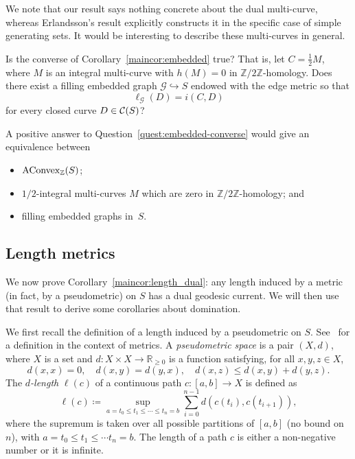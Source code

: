 We note that our result says nothing concrete about the dual multi-curve, whereas Erlandsson's result explicitly constructs it in the specific case of simple generating sets. It would be interesting to describe these multi-curves in general.

\begin{question}\label{quest:embedded-converse}
  Is the converse of Corollary~\ref{maincor:embedded} true? That is,
let $C=\frac{1}{2}M$, where $M$ is an integral
multi-curve with $h(M) = 0$ in $\mathbb{Z}/2\mathbb{Z}$-homology.
Does there exist a filling embedded graph $\mathcal{G} \hookrightarrow S$ endowed with the edge metric so that
\[
\ell_{\mathcal{G}}(D)=i(C,D)
\]
for every closed curve $D \in \mathcal{C}(S)$?
\end{question}

A positive answer to Question~\ref{quest:embedded-converse} would give
an equivalence between
\begin{itemize}
\item $\mathrm{AConvex}_{\mathbb{Z}}(S)$;
\item $1/2$-integral multi-curves $M$ which are zero in
  $\mathbb{Z}/2\mathbb{Z}$-homology; and
\item filling embedded graphs in~$S$.
\end{itemize}

\subsection{Length metrics}
\label{subsec:length-metrics}
We now prove Corollary~\ref{maincor:length_dual}: any length induced
by a metric (in fact, by a pseudometric) on $S$ has a dual geodesic
current. We will then use that result to derive some corollaries about
domination.

We first recall the definition of a length induced by a pseudometric on $S$. See~\cite[Chapter~I.1]{BH11:NonPosCurvature} for a definition in the context of metrics. A \emph{pseudometric space} is a pair $(X,d)$, where $X$ is a set and $d \colon X \times X \to \mathbb{R}_{\ge 0}$ is a function satisfying, for all $x,y,z \in X$,
\[
d(x,x)=0,\quad d(x,y)=d(y,x),\quad d(x,z)\le d(x,y)+d(y,z).
\]
 The \emph{$d$-length} $\ell(c)$ of a continuous path $c \colon [a,b] \to X$
is defined as
\begin{equation}
\ell(c) \coloneqq \sup_{a=t_0 \leq t_1 \leq \cdots \leq t_n=b} \sum_{i=0}^{n-1} d(c(t_i),c(t_{i+1})),
\label{eq:length_of_path}
\end{equation}
where the supremum is taken over all possible partitions of $[a,b]$ (no bound on $n$), with
$a=t_0 \leq t_1 \leq \cdots t_n = b$.
The length of a path $c$ is either a non-negative number or it is infinite.



